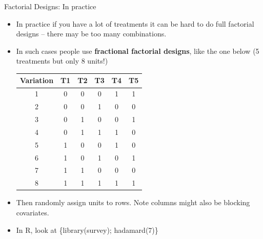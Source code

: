 \documentclass[
  11pt,
  ignorenonframetext,
]{beamer}
\providecommand{\tightlist}{%
  \setlength{\itemsep}{0pt}\setlength{\parskip}{0pt}}\usepackage{longtable,booktabs,array}
\begin{document}
\begin{frame}{Factorial Designs: In practice}
\protect\hypertarget{factorial-designs-in-practice}{}
\begin{itemize}
\tightlist
\item
  In practice if you have a lot of treatments it can be hard to do full
  factorial designs -- there may be too many combinations.\\
\item
  In such cases people use \textbf{fractional factorial designs}, like
  the one below (5 treatments but only 8 units!)

  \begin{table}[htbp]\scriptsize
    \centering
        \begin{tabular}{cccccc}\scriptsize
            Variation   &   T1  &   T2  &   T3  &   T4  &   T5  \\ \hline
            1   &   0   &   0   &   0   &   1   &   1   \\
            2   &   0   &   0   &   1   &   0   &   0   \\
            3   &   0   &   1   &   0   &   0   &   1   \\
            4   &   0   &   1   &   1   &   1   &   0   \\
            5   &   1   &   0   &   0   &   1   &   0   \\
            6   &   1   &   0   &   1   &   0   &   1   \\
            7   &   1   &   1   &   0   &   0   &   0   \\
            8   &   1   &   1   &   1   &   1   &   1   \\
        \end{tabular}
  \end{table}
\item
  Then randomly assign units to rows. Note columns might also be
  blocking covariates.
\item
  In R, look at \scriptsize \{\ttfamily library(survey); hadamard(7)\}
\end{itemize}
\end{frame}
\end{document}
